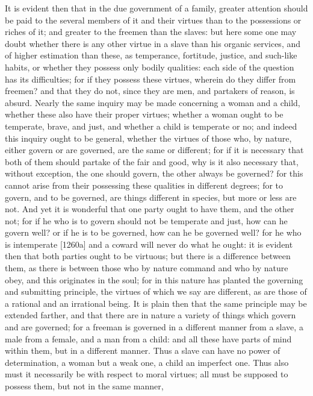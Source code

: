 It is evident then that in the due government of a family, greater
attention should be paid to the several members of it and their virtues
than to the possessions or riches of it; and greater to the freemen than
the slaves: but here some one may doubt whether there is any other virtue
in a slave than his organic services, and of higher estimation than these,
as temperance, fortitude, justice, and such-like habits, or whether they
possess only bodily qualities: each side of the question has its
difficulties; for if they possess these virtues, wherein do they differ
from freemen? and that they do not, since they are men, and partakers of
reason, is absurd. Nearly the same inquiry may be made concerning a woman
and a child, whether these also have their proper virtues; whether a woman
ought to be temperate, brave, and just, and whether a child is temperate
or no; and indeed this inquiry ought to be general, whether the virtues of
those who, by nature, either govern or are governed, are the same or
different; for if it is necessary that both of them should partake of the
fair and good, why is it also necessary that, without exception, the one
should govern, the other always be governed? for this cannot arise from
their possessing these qualities in different degrees; for to govern, and
to be governed, are things different in species, but more or less are not.
And yet it is wonderful that one party ought to have them, and the other
not; for if he who is to govern should not be temperate and just, how can
he govern well? or if he is to be governed, how can he be governed well?
for he who is intemperate [1260a] and a coward will never do what he
ought: it is evident then that both parties ought to be virtuous; but
there is a difference between them, as there is between those who by
nature command and who by nature obey, and this originates in the soul;
for in this nature has planted the governing and submitting principle, the
virtues of which we say are different, as are those of a rational and an
irrational being. It is plain then that the same principle may be extended
farther, and that there are in nature a variety of things which govern and
are governed; for a freeman is governed in a different manner from a
slave, a male from a female, and a man from a child: and all these have
parts of mind within them, but in a different manner. Thus a slave can
have no power of determination, a woman but a weak one, a child an
imperfect one. Thus also must it necessarily be with respect to moral
virtues; all must be supposed to possess them, but not in the same manner,

